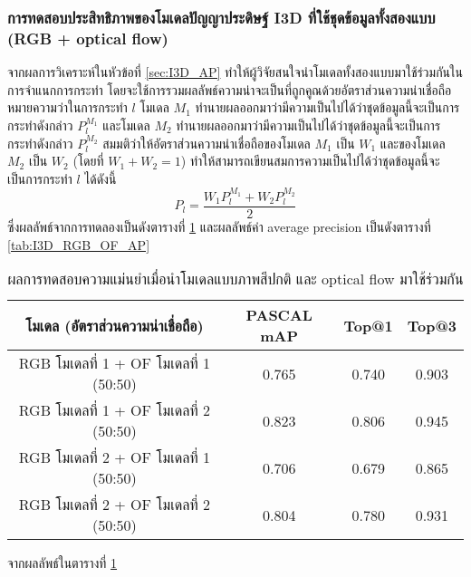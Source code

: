 \subsubsection{การทดสอบประสิทธิภาพของโมเดลปัญญาประดิษฐ์ I3D ที่ใช้ชุดข้อมูลทั้งสองแบบ (RGB + optical flow)}
จากผลการวิเคราะห์ในหัวข้อที่ \ref{sec:I3D_AP} ทำให้ผู้วิจัยสนใจนำโมเดลทั้งสองแบบมาใช้ร่วมกันในการจำแนกการกระทำ โดยจะใช้การรวมผลลัพธ์ความน่าจะเป็นที่ถูกคูณด้วยอัตราส่วนความน่าเชื่อถือ
หมายความว่าในการกระทำ $l$ โมเดล $M_1$ ทำนายผลออกมาว่ามีความเป็นไปได้ว่าชุดข้อมูลนี้จะเป็นการกระทำดังกล่าว $P_l^{M_1}$ 
และโมเดล $M_2$ ทำนายผลออกมาว่ามีความเป็นไปได้ว่าชุดข้อมูลนี้จะเป็นการกระทำดังกล่าว $P_l^{M_2}$ สมมติว่าให้อัตราส่วนความน่าเชื่อถือของโมเดล $M_1$ เป็น $W_1$
และของโมเดล $M_2$ เป็น $W_2$ (โดยที่ $W_1 + W_2 = 1$) ทำให้สามารถเขียนสมการความเป็นไปได้ว่าชุดข้อมูลนี้จะเป็นการกระทำ $l$ ได้ดังนี้
\begin{equation}
	P_l = \frac{W_1 P_l^{M_1} + W_2 P_l^{M_2}}{2}
\end{equation}
ซึ่งผลลัพธ์จากการทดลองเป็นดังตารางที่ \ref{tab:I3D_RGB_OF_performance} และผลลัพธ์ค่า average precision เป็นดังตารางที่ \ref{tab:I3D_RGB_OF_AP}
\begin{table}[!ht]
	\centering
	\begin{tabular}{|c|c|c|c|}
			\hline
			{โมเดล (อัตราส่วนความน่าเชื่อถือ)}	&	{PASCAL mAP}	&	{Top@1}	&	{Top@3}\\
			\hline
			RGB โมเดลที่ 1 + OF โมเดลที่ 1 (50:50)	& 0.765	& 0.740	& 0.903	\\
			RGB โมเดลที่ 1 + OF โมเดลที่ 2 (50:50)	& 0.823	& 0.806	& 0.945	\\
			RGB โมเดลที่ 2 + OF โมเดลที่ 1 (50:50)	& 0.706	& 0.679	& 0.865	\\
			RGB โมเดลที่ 2 + OF โมเดลที่ 2 (50:50)	& 0.804	& 0.780	& 0.931	\\
			\hline
	\end{tabular}
\caption{ผลการทดสอบความแม่นยำเมื่อนำโมเดลแบบภาพสีปกติ และ optical flow มาใช้ร่วมกัน}
\label{tab:I3D_RGB_OF_performance}
\end{table}
จากผลลัพธ์ในตารางที่ \ref{tab:I3D_RGB_OF_performance} 